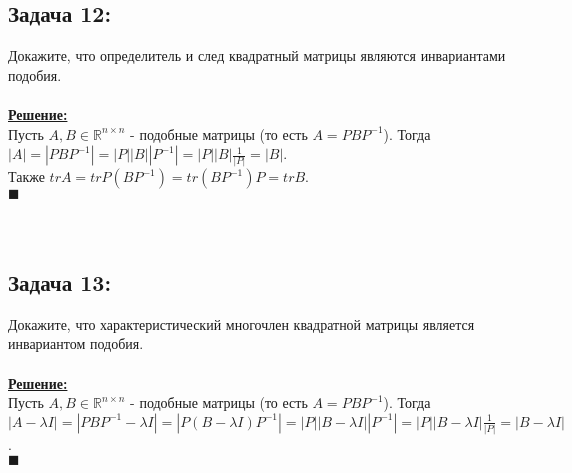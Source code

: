 \documentclass[a4paper,12pt,titlepage,final]{article}
\begin{document}
\subsection*{Задача 12:}
\noindent Докажите, что определитель и след квадратный матрицы являются инвариантами подобия. \\ \\
\textbf{\underline{Решение:}} \\
Пусть $A, B \in \mathbb{R}^{n \times n}$ - подобные матрицы (то есть $A = PBP^{-1}$).
Тогда $|A| = |PBP^{-1}| = |P||B||P^{-1}| = |P||B|\frac{1}{|P|} = |B|$. \\
Также $trA = trP(BP^{-1}) = tr(BP^{-1})P = trB$. \\ $\blacksquare$ \\ \\ \\


\subsection*{Задача 13:}
\noindent Докажите, что характеристический многочлен квадратной матрицы является инвариантом подобия. \\ \\
\textbf{\underline{Решение:}} \\
Пусть $A, B \in \mathbb{R}^{n \times n}$ - подобные матрицы (то есть $A = PBP^{-1}$).
Тогда $|A - \lambda I| = |PBP^{-1} - \lambda I| = |P(B - \lambda I)P^{-1}| = 
|P||B - \lambda I||P^{-1}| = |P||B - \lambda I|\frac{1}{|P|} = |B - \lambda I|$. \\ $\blacksquare$ \\ \\ \\


\end{document}
